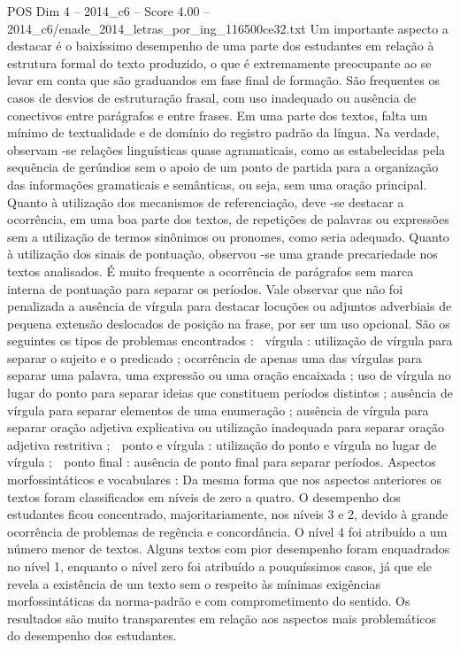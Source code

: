 \begin{textsample}{POS Dim 4 – 2014\_c6 – Score 4.00 – 2014\_c6/enade\_2014\_letras\_por\_ing\_116500ce32.txt}
Um importante aspecto a destacar é o baixíssimo desempenho de uma parte dos estudantes em relação à estrutura formal do texto produzido, o que é extremamente preocupante ao se levar em conta que são graduandos em fase final de formação.
São frequentes os casos de desvios de estruturação frasal, com uso inadequado ou ausência de conectivos entre parágrafos e entre frases.
Em uma parte dos textos, falta um mínimo de textualidade e de domínio do registro padrão da língua.
Na verdade, observam -se relações linguísticas quase agramaticais, como as estabelecidas pela sequência de gerúndios sem o apoio de um ponto de partida para a organização das informações gramaticais e semânticas, ou seja, sem uma oração principal.
Quanto à utilização dos mecanismos de referenciação, deve -se destacar a ocorrência, em uma boa parte dos textos, de repetições de palavras ou expressões sem a utilização de termos sinônimos ou pronomes, como seria adequado.
Quanto à utilização dos sinais de pontuação, observou -se uma grande precariedade nos textos analisados.
É muito frequente a ocorrência de parágrafos sem marca interna de pontuação para separar os períodos.
Vale observar que não foi penalizada a ausência de vírgula para destacar locuções ou adjuntos adverbiais de pequena extensão deslocados de posição na frase, por ser um uso opcional.
São os seguintes os tipos de problemas encontrados :  vírgula : utilização de vírgula para separar o sujeito e o predicado ; ocorrência de apenas uma das vírgulas para separar uma palavra, uma expressão ou uma oração encaixada ; uso de vírgula no lugar do ponto para separar ideias que constituem períodos distintos ; ausência de vírgula para separar elementos de uma enumeração ; ausência de vírgula para separar oração adjetiva explicativa ou utilização inadequada para separar oração adjetiva restritiva ;  ponto e vírgula : utilização do ponto e vírgula no lugar de vírgula ;  ponto final : ausência de ponto final para separar períodos.
Aspectos morfossintáticos e vocabulares : Da mesma forma que nos aspectos anteriores os textos foram classificados em níveis de zero a quatro.
O desempenho dos estudantes ficou concentrado, majoritariamente, nos níveis 3 e 2, devido à grande ocorrência de problemas de regência e concordância.
O nível 4 foi atribuído a um número menor de textos.
Alguns textos com pior desempenho foram enquadrados no nível 1, enquanto o nível zero foi atribuído a pouquíssimos casos, já que ele revela a existência de um texto sem o respeito às mínimas exigências morfossintáticas da norma-padrão e com comprometimento do sentido.
Os resultados são muito transparentes em relação aos aspectos mais problemáticos do desempenho dos estudantes.

\end{textsample}

